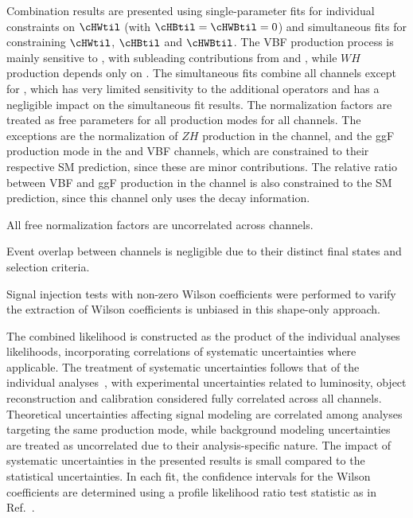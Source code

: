 \documentclass[PAPER, atlasdraft=false, cernpreprint,UKenglish, texmf, orcidlogo]{atlasdoc}
\begin{document}
Combination results are presented using single-parameter fits for individual constraints on $\cHWtil$ (with \mbox{$\cHBtil = \cHWBtil=0$}) and simultaneous fits for constraining $\cHWtil$, $\cHBtil$ and $\cHWBtil$. The VBF production process is mainly sensitive to \cHWtil, with subleading contributions from \cHWBtil and \cHBtil, while $WH$ production depends only on \cHWtil.
The simultaneous fits combine all channels except for \HGam, which has very limited sensitivity to the additional operators and has a negligible impact on the simultaneous fit results.
The normalization factors are treated as free parameters for all production modes for all channels.
The exceptions are the normalization of $ZH$ production in the \WHbb channel, and the ggF production mode in the \WHbb and VBF \Htautau channels, which are constrained to their respective SM prediction, since these are minor contributions.
The relative ratio between VBF and ggF production in the \HZZ channel is also constrained to the SM prediction, since this channel only uses the decay information.


All free normalization factors are uncorrelated across channels.

Event overlap between channels is negligible due to their distinct final states and selection criteria.


Signal injection tests with non-zero Wilson coefficients were performed to varify the extraction of Wilson coefficients is unbiased in this shape-only approach.





The combined likelihood is constructed as the product of the individual analyses likelihoods, incorporating correlations of systematic uncertainties where applicable. The treatment of systematic uncertainties follows that of the individual analyses~\cite{HIGG-2020-08,HIGP-2024-09,HIGP-2024-07,HIGG-2018-30}, with experimental uncertainties related to luminosity, object reconstruction and calibration considered fully correlated across all channels. Theoretical uncertainties affecting signal modeling are correlated among analyses targeting the same production mode, while background modeling uncertainties are treated as uncorrelated due to their analysis-specific nature. The impact of systematic uncertainties in the presented results is small compared to the statistical uncertainties. In each fit, the confidence intervals for the Wilson coefficients are determined using a profile likelihood ratio test statistic as in Ref.~\cite{HIGG-2018-30}.
\end{document}
